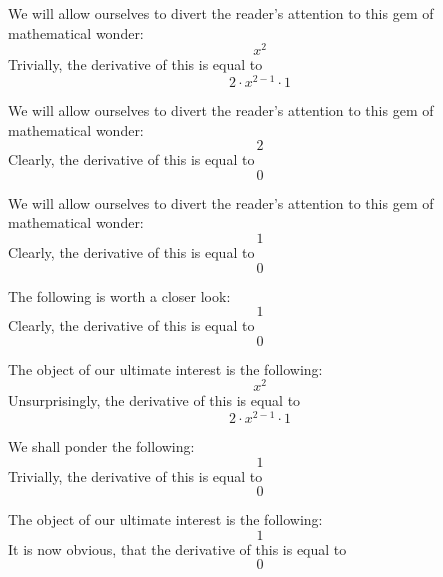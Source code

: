 \documentclass{article}
\begin{document}
We will allow ourselves to divert the reader's attention to this gem of mathematical wonder:
\begin{equation}
x ^{2 } 
\end{equation}
Trivially, the derivative of this is equal to
\begin{equation}
2 \cdot x ^{2 - 1 } \cdot 1 
\end{equation}

We will allow ourselves to divert the reader's attention to this gem of mathematical wonder:
\begin{equation}
2 
\end{equation}
Clearly, the derivative of this is equal to
\begin{equation}
0 
\end{equation}

We will allow ourselves to divert the reader's attention to this gem of mathematical wonder:
\begin{equation}
1 
\end{equation}
Clearly, the derivative of this is equal to
\begin{equation}
0 
\end{equation}

The following is worth a closer look:
\begin{equation}
1 
\end{equation}
Clearly, the derivative of this is equal to
\begin{equation}
0 
\end{equation}

The object of our ultimate interest is the following:
\begin{equation}
x ^{2 } 
\end{equation}
Unsurprisingly, the derivative of this is equal to
\begin{equation}
2 \cdot x ^{2 - 1 } \cdot 1 
\end{equation}

We shall ponder the following:
\begin{equation}
1 
\end{equation}
Trivially, the derivative of this is equal to
\begin{equation}
0 
\end{equation}

The object of our ultimate interest is the following:
\begin{equation}
1 
\end{equation}
It is now obvious, that the derivative of this is equal to
\begin{equation}
0 
\end{equation}
\end{document}
